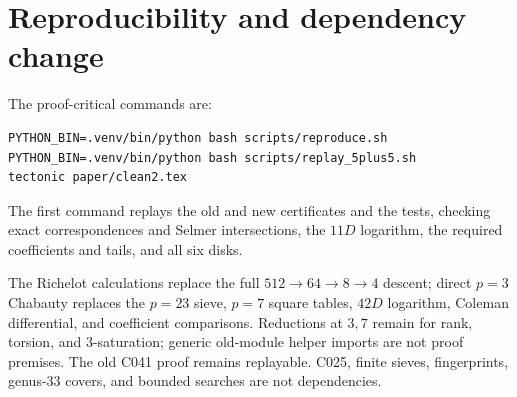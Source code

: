 \documentclass[11pt]{article}
\begin{document}
\section*{Reproducibility and dependency change}

\begingroup\small
The proof-critical commands are:
\begin{verbatim}
PYTHON_BIN=.venv/bin/python bash scripts/reproduce.sh
PYTHON_BIN=.venv/bin/python bash scripts/replay_5plus5.sh
tectonic paper/clean2.tex
\end{verbatim}
The first command replays the old and new certificates and the tests,
checking exact correspondences and Selmer intersections, the \(11D\)
logarithm, the required coefficients and tails, and all six disks.

The Richelot calculations replace the full \(512\to64\to8\to4\) descent;
direct \(p=3\) Chabauty replaces the \(p=23\) sieve, \(p=7\) square tables,
\(42D\) logarithm, Coleman differential, and coefficient comparisons.
Reductions at \(3,7\) remain for rank, torsion, and \(3\)-saturation; generic
old-module helper imports are not proof premises.  The old C041 proof remains
replayable.  C025, finite sieves, fingerprints, genus-$33$ covers, and bounded
searches are not dependencies.
\endgroup
\end{document}
